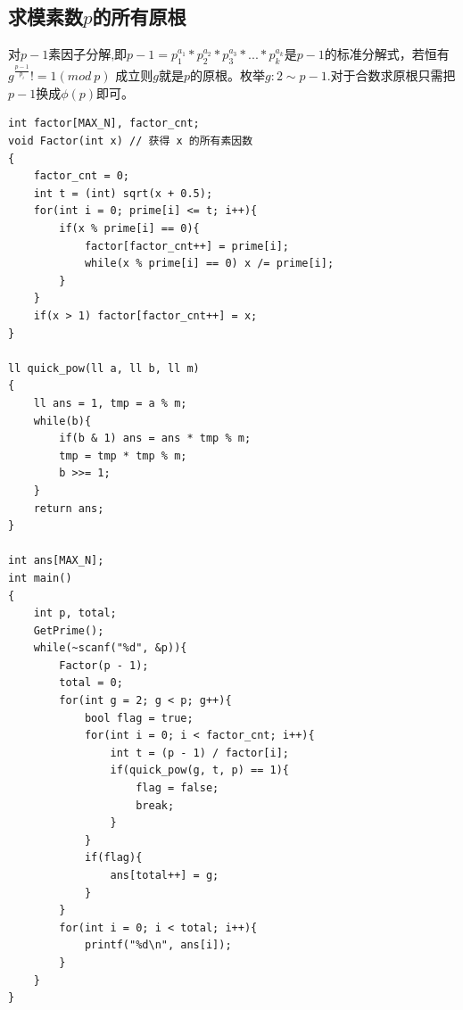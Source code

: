 \subsection{求模素数$p$的所有原根}
对$p -1$素因子分解,即$p - 1 = p_1^{a_1} * p_2^{a_2} * p_3^{a_3} * ... * p_k^{a_k}$是$p-1$的标准分解式，若恒有$g^{\frac{p-1}{p_i}}!= 1( mod\  p)$ 成立则$g$就是$p$的原根。枚举$g:2 \sim p-1$.对于合数求原根只需把$p-1$换成$\phi(p)$即可。
\begin{lstlisting}
int factor[MAX_N], factor_cnt;
void Factor(int x) // 获得 x 的所有素因数
{
    factor_cnt = 0;
    int t = (int) sqrt(x + 0.5);
    for(int i = 0; prime[i] <= t; i++){
        if(x % prime[i] == 0){
            factor[factor_cnt++] = prime[i];
            while(x % prime[i] == 0) x /= prime[i];
        }
    }
    if(x > 1) factor[factor_cnt++] = x;
}

ll quick_pow(ll a, ll b, ll m)
{
    ll ans = 1, tmp = a % m;
    while(b){
        if(b & 1) ans = ans * tmp % m;
        tmp = tmp * tmp % m;
        b >>= 1;
    }
    return ans;
}

int ans[MAX_N];
int main()
{
    int p, total;
    GetPrime();
    while(~scanf("%d", &p)){
        Factor(p - 1);
        total = 0;
        for(int g = 2; g < p; g++){
            bool flag = true;
            for(int i = 0; i < factor_cnt; i++){
                int t = (p - 1) / factor[i];
                if(quick_pow(g, t, p) == 1){
                    flag = false;
                    break;
                }
            }
            if(flag){
                ans[total++] = g;
            }
        }
        for(int i = 0; i < total; i++){
            printf("%d\n", ans[i]);
        }
    }
}
\end{lstlisting}


